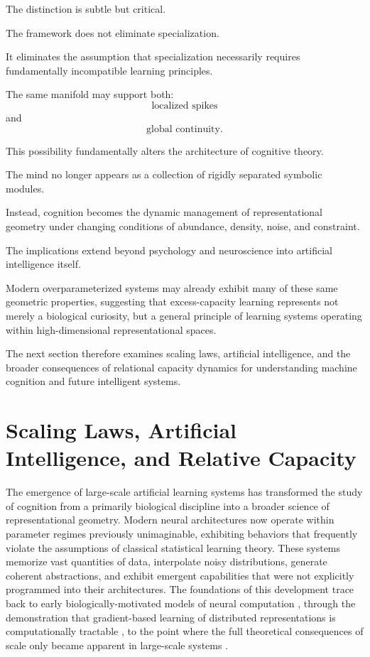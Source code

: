 \documentclass[12pt,a4paper]{article}
\begin{document}
The distinction is subtle but critical.

The framework does not eliminate specialization.

It eliminates the assumption that specialization necessarily requires fundamentally incompatible learning principles.

The same manifold may support both:
\[
\text{localized spikes}
\]
and
\[
\text{global continuity}.
\]

This possibility fundamentally alters the architecture of cognitive theory.

The mind no longer appears as a collection of rigidly separated symbolic modules.

Instead, cognition becomes the dynamic management of representational geometry under changing conditions of abundance, density, noise, and constraint.

The implications extend beyond psychology and neuroscience into artificial intelligence itself.

Modern overparameterized systems may already exhibit many of these same geometric properties, suggesting that excess-capacity learning represents not merely a biological curiosity, but a general principle of learning systems operating within high-dimensional representational spaces.

The next section therefore examines scaling laws, artificial intelligence, and the broader consequences of relational capacity dynamics for understanding machine cognition and future intelligent systems.

\section{Scaling Laws, Artificial Intelligence, and Relative Capacity}

The emergence of large-scale artificial learning systems has transformed the study of cognition from a primarily biological discipline into a broader science of representational geometry. Modern neural architectures now operate within parameter regimes previously unimaginable, exhibiting behaviors that frequently violate the assumptions of classical statistical learning theory. These systems memorize vast quantities of data, interpolate noisy distributions, generate coherent abstractions, and exhibit emergent capabilities that were not explicitly programmed into their architectures. The foundations of this development trace back to early biologically-motivated models of neural computation \cite{Rosenblatt1958}, through the demonstration that gradient-based learning of distributed representations is computationally tractable \cite{Rumelhart1986}, to the point where the full theoretical consequences of scale only became apparent in large-scale systems \cite{Goodfellow2016}.
\end{document}
